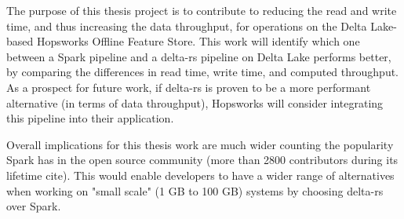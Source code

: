 The purpose of this thesis project is to contribute to reducing the read and write time, and thus increasing the data throughput, for operations on the Delta Lake-based  Hopsworks Offline Feature Store. This work will identify which one between a Spark pipeline and a delta-rs pipeline on Delta Lake performs better, by comparing the differences in read time, write time, and computed throughput. As a prospect for future work, if delta-rs is proven to be a more performant alternative (in terms of data throughput), Hopsworks will consider integrating this pipeline into their application.

Overall implications for this thesis work are much wider counting the popularity Spark has in the open source community (more than 2800 contributors during its lifetime cite). This would enable developers to have a wider range of alternatives when working on "small scale" (1 GB to 100 GB) systems by choosing delta-rs over Spark.